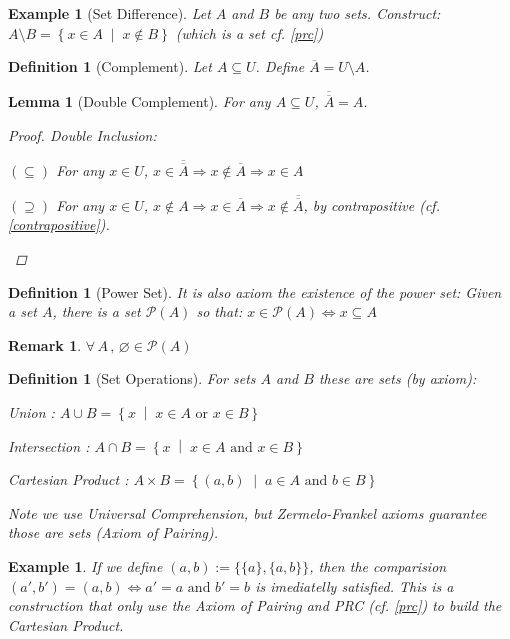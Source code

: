 \documentclass[12pt]{article}
\let\emptyset\varnothing
\let\RA\Rightarrow
\let\LR\Leftrightarrow
\let\bar\overline
\newcommand{\set}[2]{\left\{{#1}\;\middle|\;{#2}\right\}}
\newcommand{\Forall}[1]{\forall\,{#1}\,,\,}
\newtheorem{definition}[theorem]{Definition}
\newtheorem{lemma}[theorem]{Lemma}
\newtheorem{example}[theorem]{Example}
\newtheorem{remark}[theorem]{Remark}
\begin{document}
\begin{example}[Set Difference]
  Let $A$ and $B$ be any two sets. Construct: $A\setminus B=\set{x\in A}{x\notin B}$ (which is a set cf. \ref{prc})
\end{example}

\begin{definition}[Complement]
  Let $A\subseteq U$. Define $\bar{A}=U\setminus A$.
\end{definition}

\begin{lemma}[Double Complement]
  For any $A\subseteq U$, $\bar{\bar{A}}=A$.
  \begin{proof}
    Double Inclusion:
    \begin{compactitem}
      \item [$(\subseteq)$] For any $x\in U$, $x\in\bar{\bar{A}}\RA x\notin \bar{A}\RA x\in A$
      \item [$(\supseteq)$] For any $x\in U$, $x\notin A\RA x\in \bar{A}\RA x\notin\bar{\bar{A}}$, by contrapositive (cf. \ref{contrapositive}).
    \end{compactitem}
  \end{proof}
\end{lemma}

\begin{definition}[Power Set]
  It is also axiom the existence of the power set: Given a set $A$, there is a set $\mathcal{P}(A)$ so that: $x\in \mathcal{P}(A) \LR x \subseteq A$
\end{definition}

\begin{remark}
  $\Forall{A}\emptyset\in\mathcal{P}(A)$
\end{remark}

\begin{definition}[Set Operations]
  For sets $A$ and $B$ these are sets (by axiom):
  \begin{compactitem}
    \item[] Union : $A\cup B=\set{x}{x\in A \text{ or } x\in B}$
    \item[] Intersection : $A\cap B=\set{x}{x\in A \text{ and } x\in B}$
    \item[] Cartesian Product : $A\times B=\set{(a,b)}{a\in A \text{ and } b\in B}$
  \end{compactitem}
  Note we use Universal Comprehension, but Zermelo-Frankel axioms guarantee those are sets (Axiom of Pairing).
\end{definition}

\begin{example}
  If we define $(a,b):=\{\{a\},\{a,b\}\}$, then the comparision $(a',b')=(a,b)\LR a'=a\text{ and }b'=b$ is imediatelly satisfied. This is a construction that only use the Axiom of Pairing and PRC (cf. \ref{prc}) to build the Cartesian Product.
\end{example}
\end{document}
